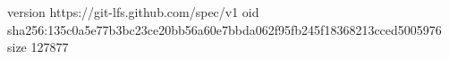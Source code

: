 version https://git-lfs.github.com/spec/v1
oid sha256:135c0a5e77b3bc23ce20bb56a60e7bbda062f95fb245f18368213cced5005976
size 127877
